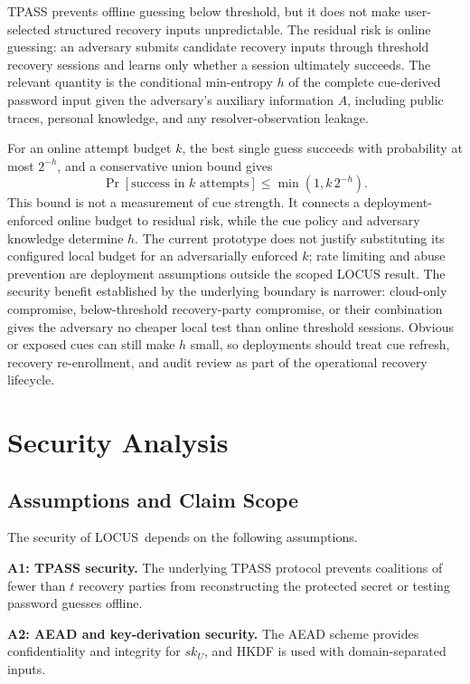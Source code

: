 \documentclass[sigconf,anonymous]{acmart}
\newcounter{protocol}
\newcommand{\LOCUS}{\textsf{LOCUS}}
\begin{document}
TPASS prevents offline guessing below threshold, but it does not make user-selected structured recovery inputs unpredictable. The residual risk is online guessing: an adversary submits candidate recovery inputs through threshold recovery sessions and learns only whether a session ultimately succeeds. The relevant quantity is the conditional min-entropy \(h\) of the complete cue-derived password input given the adversary's auxiliary information \(A\), including public traces, personal knowledge, and any resolver-observation leakage.

For an online attempt budget \(k\), the best single guess succeeds with probability at most \(2^{-h}\), and a conservative union bound gives
\[
\Pr[\text{success in }k\text{ attempts}]
\le
\min(1,k\,2^{-h}).
\]
This bound is not a measurement of cue strength. It connects a deployment-enforced online budget to residual risk, while the cue policy and adversary knowledge determine \(h\). The current prototype does not justify substituting its configured local budget for an adversarially enforced \(k\); rate limiting and abuse prevention are deployment assumptions outside the scoped LOCUS result. The security benefit established by the underlying boundary is narrower: cloud-only compromise, below-threshold recovery-party compromise, or their combination gives the adversary no cheaper local test than online threshold sessions. Obvious or exposed cues can still make \(h\) small, so deployments should treat cue refresh, recovery re-enrollment, and audit review as part of the operational recovery lifecycle.

\section{Security Analysis}
\label{sec:security}

\subsection{Assumptions and Claim Scope}

The security of \LOCUS\ depends on the following assumptions.

\textbf{A1: TPASS security.}
The underlying TPASS protocol prevents coalitions of fewer than \(t\) recovery parties from reconstructing the protected secret or testing password guesses offline.

\textbf{A2: AEAD and key-derivation security.}
The AEAD scheme provides confidentiality and integrity for \(sk_U\), and HKDF is used with domain-separated inputs.
\end{document}
